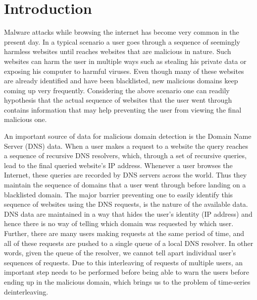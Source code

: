 \documentclass[conference]{IEEEtran}
\begin{document}
	\section{Introduction}
	Malware attacks while browsing the internet has become very common in the present day. 
	In a typical scenario a user goes through a sequence of seemingly harmless websites until reaches websites that are malicious in nature. 
	Such websites can harm the user in multiple ways such as stealing his private data or exposing his computer to harmful viruses. 
	Even though many of these websites are already identified and have been blacklisted, new malicious domains keep coming up very frequently. 
	Considering the above scenario one can readily hypothesis that the actual sequence of websites that the user went through contains information that may help preventing the user from viewing the final malicious one. 
	
	An important source of data for malicious domain detection is the Domain Name Server (DNS) data. 	
	When a user makes a request to a website the query reaches a sequence of recursive DNS resolvers, which, through a set of recursive queries, lead to the final queried website's IP address. 
	Whenever a user browses the Internet, these queries are recorded by DNS servers across the world. 
	Thus they maintain the sequence of domains that a user went through before landing on a blacklisted domain. 
	The major barrier preventing one to easily identify this sequence of websites using the DNS requests, is the nature of the available data. 
	DNS data are maintained in a way that hides the user's identity (IP address) and hence there is no way of telling which domain was requested by which user. 
	Further, there are many users making requests at the same period of time, and all of these requests are pushed to a single queue of a local DNS resolver. 
	In other words, given the queue of the resolver, we cannot tell apart individual user's sequences of requests. 
	Due to this interleaving of requests of multiple users, an important step needs to be performed before being able to warn the users before ending up in the malicious domain, which brings us to the problem of time-series deinterleaving.
\end{document}
